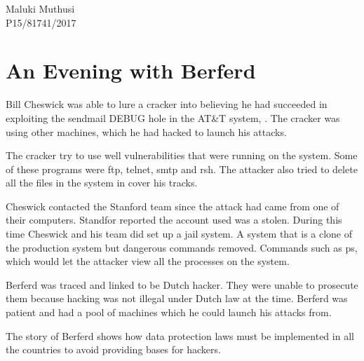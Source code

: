 \documentclass{article}
\author{Maluki Muthusi}
\begin{document}
Maluki Muthusi \\
P15/81741/2017

\section*{An Evening with Berferd}

Bill Cheswick was able to lure a cracker into believing he had succeeded in exploiting the sendmail DEBUG hole in the AT\&T system, \citep{Cheswick92anevening}. The cracker was using other machines, which he had hacked to launch his attacks.

The cracker try to use well vulnerabilities that were running on the system. Some of these programs were ftp, telnet, smtp and rsh. The attacker also tried to delete all the files in the system in cover his tracks.

Cheswick contacted the Stanford team since the attack had came from one of their computers. Standfor reported the account used was a stolen. During this time Cheswick and his team did set up a jail system. A system that is a clone of the production system but dangerous commands removed. Commands such as ps, which would let the attacker view all the processes on the system.

Berferd was traced and linked to be Dutch hacker. They were unable to prosecute them because hacking was not illegal under Dutch law at the time. Berferd was patient and had a pool of machines which he could launch his attacks from.

The story of Berferd shows how data protection laws must be implemented in all the countries to avoid providing bases for hackers.

\nocite{*}


\end{document}
